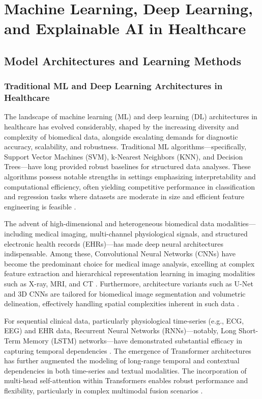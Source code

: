 \documentclass[sigconf]{acmart}
\begin{document}
\section{Machine Learning, Deep Learning, and Explainable AI in Healthcare}

\subsection{Model Architectures and Learning Methods}

\subsubsection{Traditional ML and Deep Learning Architectures in Healthcare}

The landscape of machine learning (ML) and deep learning (DL) architectures in healthcare has evolved considerably, shaped by the increasing diversity and complexity of biomedical data, alongside escalating demands for diagnostic accuracy, scalability, and robustness. Traditional ML algorithms—specifically, Support Vector Machines (SVM), k-Nearest Neighbors (KNN), and Decision Trees—have long provided robust baselines for structured data analyses. These algorithms possess notable strengths in settings emphasizing interpretability and computational efficiency, often yielding competitive performance in classification and regression tasks where datasets are moderate in size and efficient feature engineering is feasible \cite{ref16, ref28}.

The advent of high-dimensional and heterogeneous biomedical data modalities—including medical imaging, multi-channel physiological signals, and structured electronic health records (EHRs)—has made deep neural architectures indispensable. Among these, Convolutional Neural Networks (CNNs) have become the predominant choice for medical image analysis, excelling at complex feature extraction and hierarchical representation learning in imaging modalities such as X-ray, MRI, and CT \cite{ref28, ref31, ref50, ref55, ref70, ref71, ref72, ref74, ref75, ref90, ref107}. Furthermore, architecture variants such as U-Net and 3D CNNs are tailored for biomedical image segmentation and volumetric delineation, effectively handling spatial complexities inherent in such data \cite{ref49, ref50, ref56, ref53}.

For sequential clinical data, particularly physiological time-series (e.g., ECG, EEG) and EHR data, Recurrent Neural Networks (RNNs)—notably, Long Short-Term Memory (LSTM) networks—have demonstrated substantial efficacy in capturing temporal dependencies \cite{ref29, ref42, ref43, ref55}. The emergence of Transformer architectures has further augmented the modeling of long-range temporal and contextual dependencies in both time-series and textual modalities. The incorporation of multi-head self-attention within Transformers enables robust performance and flexibility, particularly in complex multimodal fusion scenarios \cite{ref28, ref31, ref35, ref48, ref49, ref54, ref65, ref76, ref77, ref90}.
\end{document}
